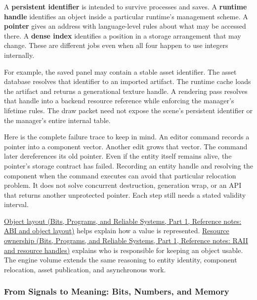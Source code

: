 A \textbf{persistent identifier} is intended to survive processes and saves. A \textbf{runtime handle} identifies an object inside a particular runtime's management scheme. A \textbf{pointer} gives an address with language-level rules about what may be accessed there. A \textbf{dense index} identifies a position in a storage arrangement that may change. These are different jobs even when all four happen to use integers internally.

For example, the saved panel may contain a stable asset identifier. The asset database resolves that identifier to an imported artifact. The runtime cache loads the artifact and returns a generational texture handle. A rendering pass resolves that handle into a backend resource reference while enforcing the manager's lifetime rules. The draw packet need not expose the scene's persistent identifier or the manager's entire internal table.

Here is the complete failure trace to keep in mind. An editor command records a pointer into a component vector. Another edit grows that vector. The command later dereferences its old pointer. Even if the entity itself remains alive, the pointer's storage contract has failed. Recording an entity handle and resolving the component when the command executes can avoid that particular relocation problem. It does not solve concurrent destruction, generation wrap, or an API that returns another unprotected pointer. Each step still needs a stated validity interval.

\href{../01-Bits-Programs-and-Reliable-Systems-P01/main.pdf\#nameddest=appendix-c4ac6bb0fff8}{Object layout (Bits, Programs, and Reliable Systems, Part 1, Reference notes: ABI and object layout)} helps explain how a value is represented. \href{../01-Bits-Programs-and-Reliable-Systems-P01/main.pdf\#nameddest=appendix-69739d3ab49b}{Resource ownership (Bits, Programs, and Reliable Systems, Part 1, Reference notes: RAII and resource handles)} explains who is responsible for keeping an object usable. The engine volume extends the same reasoning to entity identity, component relocation, asset publication, and asynchronous work.

\subsubsection{From Signals to Meaning: Bits, Numbers, and Memory}\label{05-engine-i-ch001-from-signals-to-meaning-bits-numbers-and-memory}

\hypertarget{05-engine-i-ch001-from-signals-to-meaning-bits-numbers-and-memory}{}

